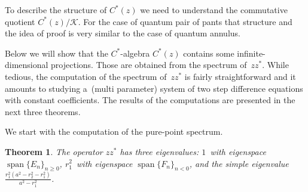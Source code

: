 \documentclass[11pt]{article}
\numberwithin{equation}{section}
\newtheorem{Theorem}{Theorem}[section]
\begin{document}
To describe the structure of $C^*(z)$ we need to understand the commutative quotient $C^*(z)/\mathcal{K}$.
For the case of quantum pair of pants that structure and the idea of proof is very similar to the case of quantum
annulus.

Below we will show that the $C^*$-algebra $C^*(z)$ contains some inf\/inite-dimensional projections.
Those are obtained from the spectrum of~$zz^*$.
While tedious, the computation of the spectrum of~$zz^*$ is fairly straightforward and it amounts to studying a~(multi
parameter) system of two step dif\/ference equations with constant coef\/f\/icients.
The results of the computations are presented in the next three theorems.

We start with the computation of the pure-point spectrum.

\begin{Theorem}
\label{discspecthm}
The operator $zz^*$ has three eigenvalues: $1$~with eigenspace $\operatorname{span}\{E_n\}_{n\geq 0}$, $r_1^2$~with eigenspace
$\operatorname{span}\{F_n\}_{n< 0}$, and the simple eigenvalue $\frac{r_1^2(a^2-r_2^2-r_1^2)}{a^2-r_1^2}$.
\end{Theorem}
\end{document}
